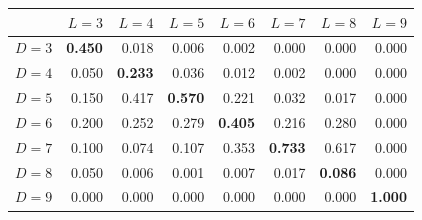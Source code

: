 \begin{tabular}{lrrrrrrr}
\toprule
 & $L=3$ & $L=4$ & $L=5$ & $L=6$ & $L=7$ & $L=8$ & $L=9$ \\
\midrule
$D=3$ & \textbf{0.450} & 0.018 & 0.006 & 0.002 & 0.000 & 0.000 & 0.000 \\
$D=4$ & 0.050 & \textbf{0.233} & 0.036 & 0.012 & 0.002 & 0.000 & 0.000 \\
$D=5$ & 0.150 & 0.417 & \textbf{0.570} & 0.221 & 0.032 & 0.017 & 0.000 \\
$D=6$ & 0.200 & 0.252 & 0.279 & \textbf{0.405} & 0.216 & 0.280 & 0.000 \\
$D=7$ & 0.100 & 0.074 & 0.107 & 0.353 & \textbf{0.733} & 0.617 & 0.000 \\
$D=8$ & 0.050 & 0.006 & 0.001 & 0.007 & 0.017 & \textbf{0.086} & 0.000 \\
$D=9$ & 0.000 & 0.000 & 0.000 & 0.000 & 0.000 & 0.000 & \textbf{1.000} \\
\bottomrule
\end{tabular}
